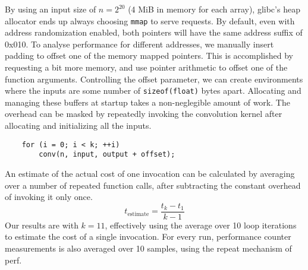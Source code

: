 \documentclass[prodmode,acmtaco]{acmsmall}
\begin{document}
{By using an input size of $n=2^{20}$ (4 MiB in memory for each array), glibc's heap allocator ends up always choosing \texttt{mmap} to serve requests.
By default, even with address randomization enabled, both pointers will have the same address suffix of 0x010.
To analyse performance for different addresses, we manually insert padding to offset one of the memory mapped pointers.
This is accomplished by requesting a bit more memory, and use pointer arithmetic to offset one of the function arguments.
Controlling the offset parameter, we can create environments where the inputs are some number of \texttt{sizeof(float)} bytes apart.
Allocating and managing these buffers at startup takes a non-neglegible amount of work.
The overhead can be masked by repeatedly invoking the convolution kernel after allocating and initializing all the inputs.
\begin{lstlisting}
    for (i = 0; i < k; ++i)
        conv(n, input, output + offset);
\end{lstlisting}
An estimate of the actual cost of one invocation can be calculated by averaging over a number of repeated function calls, after subtracting the constant overhead of invoking it only once.
\[
t_{\text{estimate}} = \frac{t_{k} - t_{1}}{k - 1}
\]
Our results are with $k=11$, effectively using the average over 10 loop iterations to estimate the cost of a single invocation.
For every run, performance counter measurements is also averaged over 10 samples, using the repeat mechanism of perf.

}
\end{document}
